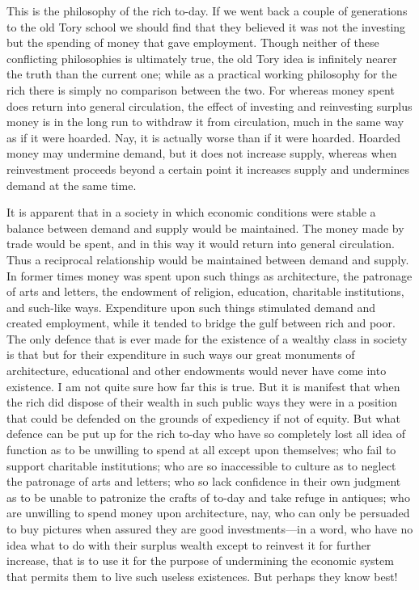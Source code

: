 \documentclass{book}
\begin{document}
This is the philosophy of the rich to-day. If we went back a couple of generations to the old Tory school we should find that they believed it was not the investing but the spending of money that gave employment. Though neither of these conflicting philosophies is ultimately true, the old Tory idea is infinitely nearer the truth than the current one; while as a practical working philosophy for the rich there is simply no comparison between the two. For whereas money spent does return into general circulation, the effect of investing and reinvesting surplus money is in the long run to withdraw it from circulation, much in the same way as if it were hoarded. Nay, it is actually worse than if it were hoarded. Hoarded money may undermine demand, but it does not increase supply, whereas when reinvestment proceeds beyond a certain point it increases supply and undermines demand at the same time.

It is apparent that in a society in which economic conditions were stable a balance between demand and supply would be maintained. The money made by trade would be spent, and in this way it would return into general circulation. Thus a reciprocal relationship would be maintained between demand and supply. In former times money was spent upon such things as architecture, the patronage of arts and letters, the endowment of religion, education, charitable institutions, and such-like ways. Expenditure upon such things stimulated demand and created employment, while it tended to bridge the gulf between rich and poor. The only defence that is ever made for the existence of a wealthy class in society is that but for their expenditure in such ways our great monuments of architecture, educational and other endowments would never have come into existence. I am not quite sure how far this is true. But it is manifest that when the rich did dispose of their wealth in such public ways they were in a position that could be defended on the grounds of expediency if not of equity. But what defence can be put up for the rich to-day who have so completely lost all idea of function as to be unwilling to spend at all except upon themselves; who fail to support charitable institutions; who are so inaccessible to culture as to neglect the patronage of arts and letters; who so lack confidence in their own judgment as to be unable to patronize the crafts of to-day and take refuge in antiques; who are unwilling to spend money upon architecture, nay, who can only be persuaded to buy pictures when assured they are good investments—in a word, who have no idea what to do with their surplus wealth except to reinvest it for further increase, that is to use it for the purpose of undermining the economic system that permits them to live such useless existences. But perhaps they know best!
\end{document}

